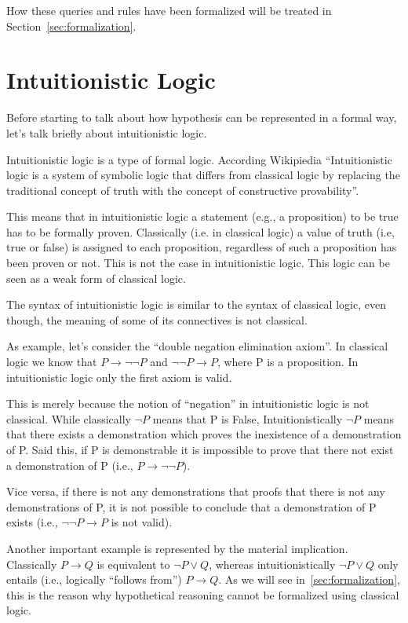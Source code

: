 How these queries and rules have been formalized will be treated in
Section~\ref{sec:formalization}.

\section{Intuitionistic Logic}
\label{sec:il}
Before starting to talk about how hypothesis can be represented in a formal way,
let's talk briefly about intuitionistic logic.

Intuitionistic logic is a type of formal logic.
According Wikipiedia ``Intuitionistic logic is a system of symbolic logic that
differs from classical logic by replacing the traditional concept of truth with
the concept of constructive provability''.

This means that in intuitionistic logic a statement (e.g., a proposition) to be true
has to be formally proven.
Classically (i.e. in classical logic) a value of truth (i.e,
true or false) is assigned to each proposition, regardless of such a proposition
has been proven or not. This is not the case in intuitionistic logic. This logic
can be seen as a weak form of classical logic.

The syntax of intuitionistic logic is similar to the syntax of classical logic,
even though, the meaning of some of its connectives is not classical.

As example, let's consider the ``double negation elimination axiom''.
In classical logic we know that $P \to \lnot\lnot P$ and $\lnot\lnot P \to  P$, where P
is a proposition. In intuitionistic logic only the first axiom is valid.

This is merely because the notion of ``negation'' in intuitionistic logic is not classical.
While classically $\lnot P$ means that P is False, Intuitionistically $\lnot P$ means that 
there exists a demonstration which proves the inexistence of a demonstration of P. 
Said this, if P is demonstrable it is impossible
to prove that there not exist a demonstration of P (i.e.,  $P \to \lnot\lnot P$).

Vice versa, if there is not any demonstrations that proofs that there is not any demonstrations of P,
it is not possible to conclude that a demonstration of P exists (i.e., $\lnot\lnot P \to  P$ is not
valid).

Another important example is represented by the material implication.
Classically $P \to Q$ is equivalent to $\lnot P \lor Q$, whereas intuitionistically
$\lnot P \lor Q$ only entails (i.e., logically ``follows from'') $P \to Q$.
As we will see in~\ref{sec:formalization}, this is the reason why hypothetical reasoning
cannot be formalized using classical logic.

